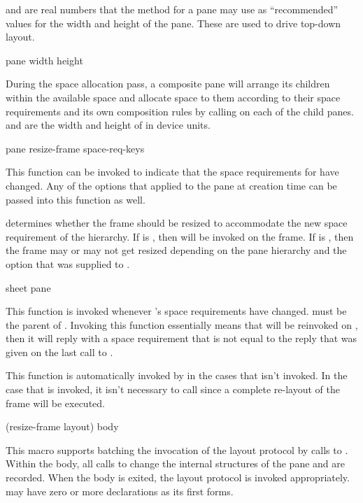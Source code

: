  and  are real numbers that the  method
for a pane may use as ``recommended'' values for the width and height of the
pane.  These are used to drive top-down layout.

 {pane width height}

During the space allocation pass, a composite pane will arrange its children
within the available space and allocate space to them according to their space
requirements and its own composition rules by calling  on
each of the child panes.   and  are the width and height
of  in device units.


 {pane \key resize-frame \rest space-req-keys}

This function can be invoked to indicate that the space requirements for
 have changed.  Any of the options that applied to the pane at
creation time can be passed into this function as well.

 determines whether the frame should be resized to accommodate
the new space requirement of the hierarchy.  If  is
, then  will be invoked on the frame.  If
 is , then the frame may or may not get resized
depending on the pane hierarchy and the  option that was
supplied to .

 {sheet pane}

This function is invoked whenever 's space requirements have changed.
 must be the parent of .  Invoking this function
essentially means that  will be reinvoked on , then
it will reply with a space requirement that is not equal to the reply that was
given on the last call to .

This function is automatically invoked by  in the
cases that  isn't invoked.  In the case that 
is invoked, it isn't necessary to call 
since a complete re-layout of the frame will be executed.

 {(\key resize-frame layout) \body body}

This macro supports batching the invocation of the layout protocol by calls
to .  Within the body, all calls to
 change the internal structures of the pane and
are recorded.  When the body is exited, the layout protocol is invoked
appropriately.   may have zero or more declarations as its first
forms.


